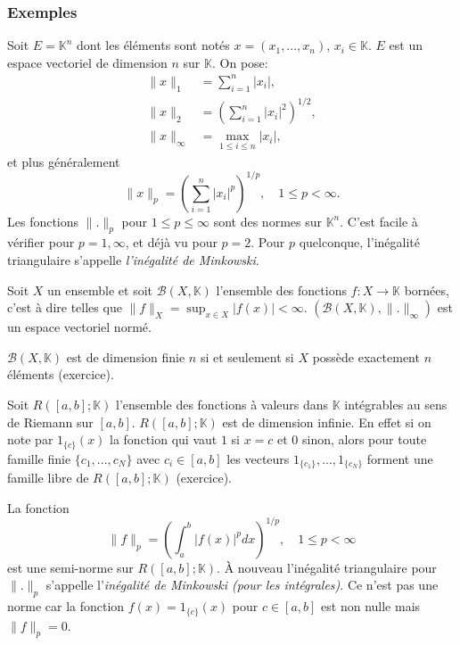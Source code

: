 \documentclass{article}
\begin{document}
\subsubsection{Exemples}
Soit $E = \mathbb{K}^n$ dont les éléments sont notés $x = (x_1, ..., x_n)$, $x_i \in \mathbb{K}$. $E$ est un espace vectoriel de dimension $n$ sur $\mathbb{K}$. On pose:
\begin{align*}
    \|x\|_1 &= \sum_{i=1}^n |x_i|, \\
    \|x\|_2 &= \left( \sum_{i=1}^n |x_i|^2 \right)^{1/2}, \\
    \|x\|_\infty &= \max_{1 \leq i \leq n} |x_i|,
\end{align*}
et plus généralement
\begin{equation}
    \|x\|_p = \left( \sum_{i=1}^n |x_i|^p \right)^{1/p}, \quad 1 \leq p < \infty.
\end{equation}
Les fonctions $\|.\|_p$ pour $1 \leq p \leq \infty$ sont des normes sur $\mathbb{K}^n$. C'est facile à vérifier pour $p=1, \infty$, et déjà vu pour $p=2$. Pour $p$ quelconque, l'inégalité triangulaire s'appelle \textit{l'inégalité de Minkowski}.

Soit $X$ un ensemble et soit $\mathcal{B}(X, \mathbb{K})$ l'ensemble des fonctions $f: X \rightarrow \mathbb{K}$ bornées, c'est à dire telles que $\|f\|_X = \sup_{x \in X} |f(x)| < \infty$. $(\mathcal{B}(X, \mathbb{K}), \|.\|_\infty)$ est un espace vectoriel normé.

$\mathcal{B}(X, \mathbb{K})$ est de dimension finie $n$ si et seulement si $X$ possède exactement $n$ éléments (exercice).

Soit $R([a, b]; \mathbb{K})$ l'ensemble des fonctions à valeurs dans $\mathbb{K}$ intégrables au sens de Riemann sur $[a, b]$. $R([a, b]; \mathbb{K})$ est de dimension infinie. En effet si on note par $1_{\{c\}}(x)$ la fonction qui vaut $1$ si $x=c$ et $0$ sinon, alors pour toute famille finie $\{c_1, ..., c_N\}$ avec $c_i \in [a, b]$ les vecteurs $1_{\{c_1\}}, ..., 1_{\{c_N\}}$ forment une famille libre de $R([a, b]; \mathbb{K})$ (exercice).

La fonction
\begin{equation}
    \|f\|_p = \left( \int_a^b |f(x)|^p dx \right)^{1/p}, \quad 1 \leq p < \infty
\end{equation}
est une semi-norme sur $R([a, b]; \mathbb{K})$. À nouveau l'inégalité triangulaire pour $\|.\|_p$ s'appelle l'\textit{inégalité de Minkowski (pour les intégrales)}. Ce n'est pas une norme car la fonction $f(x) = 1_{\{c\}}(x)$ pour $c \in [a, b]$ est non nulle mais $\|f\|_p = 0$.
\end{document}
